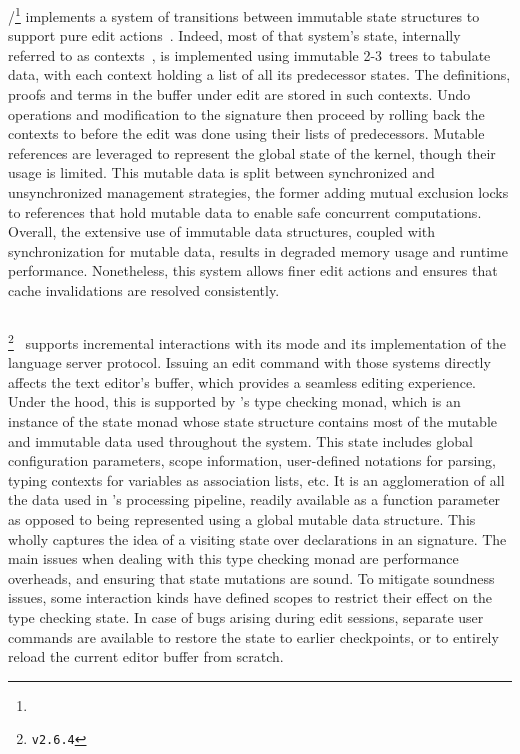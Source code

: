 \Isabelle/\Isar\footnote{} implements a system of transitions between immutable state structures to support pure edit actions~\cite{wenzel2023isabelleimpl, wenzel2023isabelleisarref, wenzel2023isabellesys}.
Indeed, most of that system's state, internally referred to as contexts~\cite{ballarin2006interpretation}, is implemented using immutable 2-3~trees to tabulate data, with each context holding a list of all its predecessor states.
The definitions, proofs and terms in the buffer under edit are stored in such contexts.
Undo operations and modification to the signature then proceed by rolling back the contexts to before the edit was done using their lists of predecessors.
Mutable references are leveraged to represent the global state of the kernel, though their usage is limited.
This mutable data is split between synchronized and unsynchronized management strategies, the former adding mutual exclusion locks to references that hold mutable data to enable safe concurrent computations.
Overall, the extensive use of immutable data structures, coupled with synchronization for mutable data, results in degraded memory usage and runtime performance.
Nonetheless, this system allows finer edit actions and ensures that cache invalidations are resolved consistently.

\subsection*{\Agda}

\Agda\footnote{\Agda \texttt{v2.6.4}}~\cite{clffolp, norell2007towards, agda2023} supports incremental interactions with its \Agda mode and its implementation of the language server protocol.
Issuing an edit command with those systems directly affects the text editor's buffer, which provides a seamless editing experience.
Under the hood, this is supported by \Agda's type checking monad, which is an instance of the state monad whose state structure contains most of the mutable and immutable data used throughout the system.
This state includes global configuration parameters, scope information, user-defined notations for parsing, typing contexts for variables as association lists, etc.
It is an agglomeration of all the data used in \Agda's processing pipeline, readily available as a function parameter as opposed to being represented using a global mutable data structure.
This wholly captures the idea of a visiting state over declarations in an \Agda signature.
The main issues when dealing with this type checking monad are performance overheads, and ensuring that state mutations are sound.
To mitigate soundness issues, some interaction kinds have defined scopes to restrict their effect on the type checking state.
In case of bugs arising during edit sessions, separate user commands are available to restore the state to earlier checkpoints, or to entirely reload the current editor buffer from scratch.


